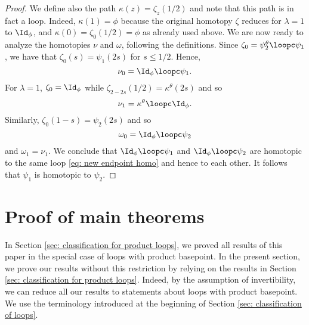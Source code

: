 \begin{proof}
	We define also the path $\kappa(z)=\zeta_{z}(1/2)$ and note that this path is in fact a loop. Indeed, $\kappa(1)=\phi$ because the original homotopy $\zeta$ reduces for $\lambda=1$ to  $\Id_\phi$, and $\kappa(0)=\zeta_0(1/2)=\phi$ as already used above. 
	We are now ready to analyze the homotopies $\nu$ and $\omega$, following the definitions. Since $\zeta_0 = \psi^\theta_2\loopc\psi_1$, we have that $\zeta_0(s) = \psi_1(2s)$ for $s\leq 1/2$. Hence,
	$$
	\nu_0 = \Id_{\phi}\loopc\psi_1.
	$$
	For $\lambda=1$, $\zeta_0 = \Id_{\phi}$ while $\zeta_{2-2s}(1/2) = \kappa^\theta(2s)$ and so
	\begin{equation}\label{eq: new endpoint homo}
	\nu_1 = \kappa^\theta\loopc \Id_{\phi}.
	\end{equation}
	Similarly, $\zeta_0(1-s) = \psi_2(2s)$ and so
	$$
	\omega_0 = \Id_{\phi}\loopc\psi_2
	$$
	and $\omega_1 = \nu_1$. We conclude that $
	\Id_{\phi}\loopc\psi_1 
	$ and $
	\Id_{\phi}\loopc\psi_2 
	$
	are homotopic to the same loop \eqref{eq: new endpoint homo} and hence to each other. It follows that $\psi_1$ is  homotopic to $\psi_2$.
\end{proof}

\section{Proof of main theorems}\label{sec: proofs of main}

In Section \ref{sec: classification for product loops}, we proved all results of this paper in the special case of loops with product basepoint.  In the present section, we prove our results without this restriction by relying on the results in Section \ref{sec: classification for product loops}. Indeed, by the assumption of invertibility, we can reduce all our results to statements about loops with product basepoint. We use the terminology introduced at the beginning of Section \ref{sec: classification of loops}.


